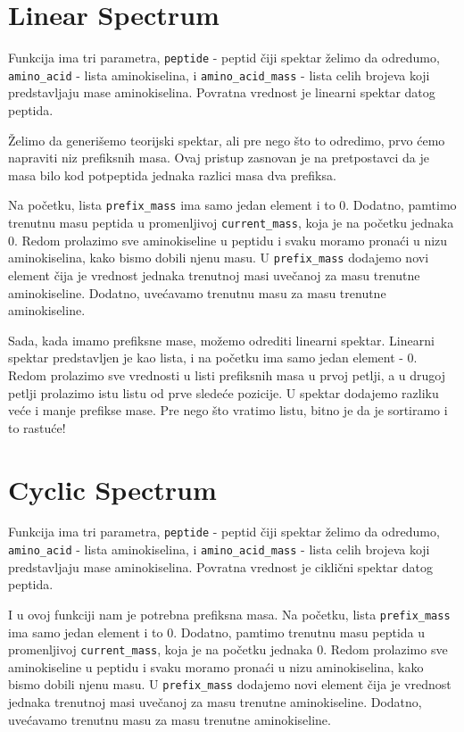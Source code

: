 \section{Linear Spectrum}
\label{linearSpectrum}
\setbookcodestyle 
Funkcija ima tri parametra, \texttt{peptide} - peptid čiji spektar želimo da odredumo, \texttt{amino\_acid} - lista aminokiselina, i \texttt{amino\_acid\_mass} - lista celih brojeva koji predstavljaju mase aminokiselina. Povratna vrednost je linearni spektar datog peptida. 

Želimo da generišemo teorijski spektar, ali pre nego što to odredimo, prvo ćemo napraviti niz prefiksnih masa. Ovaj pristup zasnovan je na pretpostavci da je masa bilo kod potpeptida jednaka razlici masa dva prefiksa. 

Na početku, lista \texttt{prefix\_mass} ima samo jedan element i to 0. Dodatno, pamtimo trenutnu masu peptida u promenljivoj \texttt{current\_mass}, koja je na početku jednaka 0. Redom prolazimo sve aminokiseline u peptidu i svaku moramo pronaći u nizu aminokiselina, kako bismo dobili njenu masu. U \texttt{prefix\_mass} dodajemo novi element čija je vrednost jednaka trenutnoj masi uvečanoj za masu trenutne aminokiseline. Dodatno, uvećavamo trenutnu masu za masu trenutne aminokiseline.

Sada, kada imamo prefiksne mase, možemo odrediti linearni spektar. Linearni spektar predstavljen je kao lista, i na početku ima samo jedan element - 0. Redom prolazimo sve vrednosti u listi prefiksnih masa u prvoj petlji, a u drugoj petlji prolazimo istu listu od prve sledeće pozicije. U spektar dodajemo razliku veće i manje prefikse mase. Pre nego što vratimo listu, bitno je da je sortiramo i to rastuće!




\section{Cyclic Spectrum}
\label{cyclicSpectrum}

Funkcija ima tri parametra, \texttt{peptide} - peptid čiji spektar želimo da odredumo, \texttt{amino\_acid} - lista aminokiselina, i \texttt{amino\_acid\_mass} - lista celih brojeva koji predstavljaju mase aminokiselina. Povratna vrednost je ciklični spektar datog peptida. 

I u ovoj funkciji nam je potrebna prefiksna masa. Na početku, lista \texttt{prefix\_mass} ima samo jedan element i to 0. Dodatno, pamtimo trenutnu masu peptida u promenljivoj \texttt{current\_mass}, koja je na početku jednaka 0. Redom prolazimo sve aminokiseline u peptidu i svaku moramo pronaći u nizu aminokiselina, kako bismo dobili njenu masu. U \texttt{prefix\_mass} dodajemo novi element čija je vrednost jednaka trenutnoj masi uvečanoj za masu trenutne aminokiseline. Dodatno, uvećavamo trenutnu masu za masu trenutne aminokiseline.

